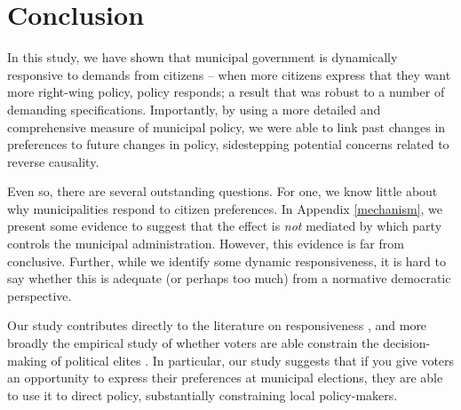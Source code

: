 \documentclass[a4paper,12pt]{article}
\begin{document}
\section*{Conclusion}

In this study, we have shown that municipal government is dynamically responsive to demands from citizens -- when more citizens express that they want more right-wing policy, policy responds; a result that was robust to a number of demanding specifications. Importantly, by using a more detailed and comprehensive measure of municipal policy, we were able to link past changes in preferences to future changes in policy, sidestepping potential concerns related to reverse causality. 

Even so, there are several outstanding questions. For one, we know little about why municipalities respond to citizen preferences. In Appendix \ref{mechanism}, we present some evidence to suggest that the effect is \textit{not} mediated by which party controls the municipal administration. However, this evidence is far from conclusive. Further, while we identify some dynamic responsiveness, it is hard to say whether this is adequate (or perhaps too much) from a normative democratic perspective.

Our study contributes directly to the literature on responsiveness \citep{tausanovitch2014representation}, and more broadly the empirical study of whether voters are able constrain the decision-making of political elites \citep{berry2009imperfect}. In particular, our study suggests that if you give voters an opportunity to express their preferences at municipal elections, they are able to use it to direct policy, substantially constraining local policy-makers.





\onehalfspacing



\clearpage

\renewcommand{\thesubsection}{\Alph{subsection}}
\renewcommand{\thetable}{\Alph{subsection}\arabic{table}}
\renewcommand{\thefigure}{\Alph{subsection}\arabic{figure}}
\end{document}
